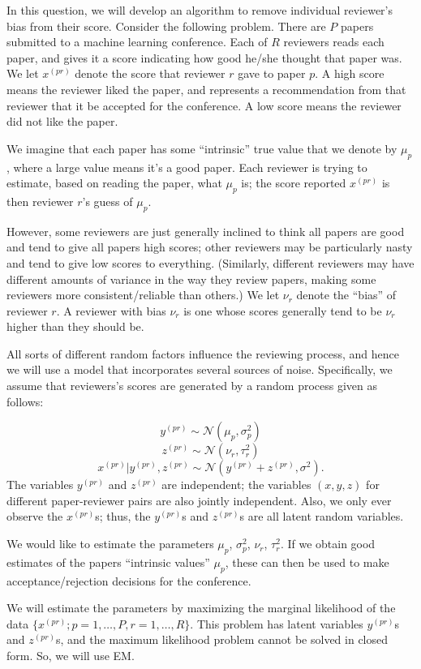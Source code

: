 \documentclass[12pt]{article}
\begin{document}
In this question, we will develop an algorithm to remove individual reviewer's bias from their score. Consider the following problem. There are $P$ papers submitted to a machine learning conference. Each of $R$ reviewers reads each paper, and gives it a score indicating how good he/she thought that paper was. We let $x^{(pr)}$ denote the score that reviewer $r$ gave to paper $p$. A high score means the reviewer liked the paper, and represents a recommendation from that reviewer that it be accepted for the conference. A low score means the reviewer did not like the paper.

We imagine that each paper has some ``intrinsic'' true value that we denote by $\mu_p$, where a large value means it's a good paper. Each reviewer is trying to estimate, based on reading the paper, what $\mu_p$ is; the score reported $x^{(pr)}$ is then reviewer $r$'s guess of $\mu_p$.

However, some reviewers are just generally inclined to think all papers are good and tend to give all papers high scores; other reviewers may be particularly nasty and tend to give low scores to everything. (Similarly, different reviewers may have different amounts of variance in the way they review papers, making some reviewers more consistent/reliable than others.) We let $\nu_r$ denote the ``bias'' of reviewer $r$. A reviewer with bias $\nu_r$ is one whose scores generally tend to be $\nu_r$ higher than they should be.

All sorts of different random factors influence the reviewing process, and hence we will use a model that incorporates several sources of noise. Specifically, we assume that reviewers's scores are generated by a random process given as follows:

\[
y^{(pr)} \sim \mathcal{N}(\mu_p, \sigma_p^2)
\]
\[
z^{(pr)} \sim \mathcal{N}(\nu_r, \tau_r^2)
\]
\[
x^{(pr)}|y^{(pr)}, z^{(pr)} \sim\mathcal{N}(y^{(pr)}+ z^{(pr)}, \sigma^2).
\]
The variables $y^{(pr)}$ and $z^{(pr)}$ are independent; the variables $(x,y,z)$ for different paper-reviewer pairs are also jointly independent. Also, we only ever observe the $x^{(pr)}$s; thus, the $y^{(pr)}$s and $z^{(pr)}$s are all latent random variables.
 
We would like to estimate the parameters $\mu_p$, $\sigma_p^2$, $\nu_r$, $\tau_r^2$. If we obtain good estimates of the papers ``intrinsic values'' $\mu_p$, these can then be used to make acceptance/rejection decisions for the conference. 

We will estimate the parameters by maximizing the marginal likelihood of the data $\{x^{(pr)}; p = 1,\ldots,P,r = 1,\ldots,R\}$. This problem has latent variables $y^{(pr)}$s and $z^{(pr)}$s, and the maximum likelihood problem cannot be solved in closed form. So, we will use EM. 
\end{document}
